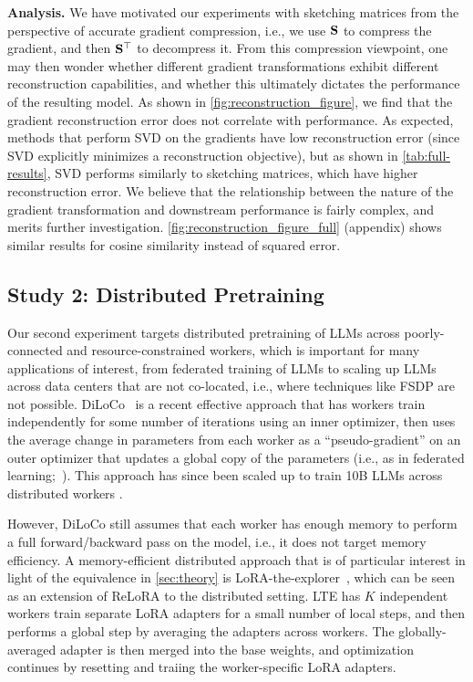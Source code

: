 \noindent\textbf{Analysis.}
We have motivated our experiments with sketching matrices from the perspective of accurate gradient compression, i.e., we use ${\mathbf{S}}$ to compress the gradient, and then ${\mathbf{S}}^\top$ to decompress it.
From this compression viewpoint, one may then wonder whether different gradient transformations exhibit different reconstruction capabilities, and whether this ultimately dictates the performance of the resulting model. As shown in \cref{fig:reconstruction_figure}, we find that the gradient reconstruction error does not correlate with performance. As expected, methods that perform SVD on the gradients have low reconstruction error (since SVD explicitly minimizes a reconstruction objective), but as shown in \cref{tab:full-results}, SVD performs similarly to sketching matrices, which have higher reconstruction error. We believe that the relationship between the nature of the gradient transformation and downstream performance is fairly complex, and merits further investigation. \cref{fig:reconstruction_figure_full} (appendix) shows similar results for cosine similarity instead of squared error.





\vcram{-2mm}
\subsection{Study 2: Distributed Pretraining}
\vcram{-2mm}
\label{sec:applications-lora-to-galore}






Our second experiment targets distributed pretraining of LLMs across poorly-connected and resource-constrained workers, which is important for many applications of interest, from federated training of LLMs to scaling up LLMs across data centers that are not co-located, i.e., where techniques like FSDP are not possible. DiLoCo~\citep{diloco} is a recent effective approach that has workers train independently for some number of iterations using an inner optimizer, then uses the average change in parameters from each worker as a ``pseudo-gradient'' on an outer optimizer that updates a global copy of the parameters (i.e., as in federated learning;~\citealp{mcmahan2017communication,reddi2020adaptive}). This  approach has since been scaled up to train 10B LLMs across distributed workers \cite{opendiloco}.




However, DiLoCo still assumes that each worker has enough memory to perform a full forward/backward pass on the model, i.e., it does not target memory efficiency. A memory-efficient distributed approach that is of particular interest in light of the equivalence in \cref{sec:theory} is LoRA-the-explorer~\citep[LTE;][]{lte}, which can be seen as an extension of ReLoRA to the distributed setting. LTE has $K$ independent workers train separate LoRA adapters for a small number  of {local} steps, and then performs a {global} step by averaging the adapters across workers. The globally-averaged adapter is then merged into the base weights, and optimization continues  by resetting and traiing the worker-specific LoRA adapters.

